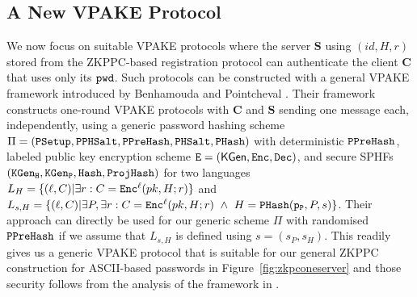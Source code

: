 \subsection{A New VPAKE Protocol} \label{sec:vpake}
We now focus on suitable VPAKE protocols where the server $\bm{S}$ using $(id, H, r)$ stored from the ZKPPC-based registration protocol can authenticate the client $\bm{C}$ that uses only its $\mathtt{pwd}$. 
Such protocols can be constructed with a general VPAKE framework introduced by Benhamouda and Pointcheval \cite{BenhamoudaP13}. 
Their framework constructs one-round VPAKE protocols with $\bm{C}$ and $\bm{S}$ sending one message each, independently, using a generic password hashing scheme $\Pi=(\mathtt{PSetup},\allowbreak\mathtt{PPHSalt},\allowbreak\mathtt{PPreHash},\mathtt{PHSalt},\allowbreak\mathtt{PHash})$ with deterministic $\mathtt{PPreHash}$, labeled public key encryption scheme $\mathtt{E} = (\mathsf{KGen},\allowbreak \mathtt{Enc}, \mathtt{Dec})$, and secure SPHFs $(\mathtt{KGen_H},\allowbreak\mathtt{KGen_P},\allowbreak\mathtt{Hash},\allowbreak\mathtt{ProjHash})$ for two languages $L_H = \{(\ell, C) | \exists r : C = \mathtt{Enc}^\ell(pk, H; r)\}$ and $L_{s,H}  = \{(\ell, C) | \exists P, \exists r : C = \mathtt{Enc}^\ell(pk, H; r)\ \wedge\ H = \mathtt{PHash}(\mathtt{p_P},\allowbreak P, s)\}$. 
Their approach can directly be used for our generic scheme $\Pi$ with randomised $\mathtt{PPreHash}$ if we assume that $L_{s,H}$ is defined using $s=(s_P,s_H)$. 
This readily gives us a generic VPAKE protocol that is suitable for our general ZKPPC construction for ASCII-based passwords in Figure~\ref{fig:zkpconeserver} and those security follows from the analysis of the framework in \cite{BenhamoudaP13}.

